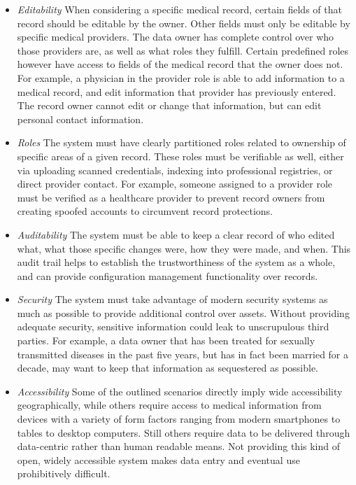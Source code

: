\documentclass[10pt, conference, compsocconf]{IEEEtran}
\begin{document}
\begin{itemize}

\item \textit{Editability} When considering a specific medical record, certain fields of that record should be editable by the owner.  Other fields must only be editable by specific medical providers.  The data owner has complete control over who those providers are, as well as what roles they fulfill.  Certain predefined roles however have access to fields of the medical record that the owner does not.  For example, a physician in the provider role is able to add information to a medical record, and edit information that provider has previously entered.  The record owner cannot edit or change that information, but can edit personal contact information.

\item \textit{Roles} The system must have clearly partitioned roles related to ownership of specific areas of a given record.  These roles must be verifiable as well, either via uploading scanned credentials, indexing into professional registries, or direct provider contact.  For example, someone assigned to a provider role must be verified as a healthcare provider to prevent record owners from creating spoofed accounts to circumvent record protections.

\item \textit{Auditability} The system must be able to keep a clear record of who edited what, what those specific changes were, how they were made, and when.  This audit trail helps to establish the trustworthiness of the system as a whole, and can provide configuration management functionality over records.

\item \textit{Security} The system must take advantage of modern security systems as much as possible to provide additional control over assets.  Without providing adequate security, sensitive information could leak to unscrupulous third parties.  For example, a data owner that has been treated for sexually transmitted diseases in the past five years, but has in fact been married for a decade, may want to keep that information as sequestered as possible.

\item \textit{Accessibility} Some of the outlined scenarios directly imply wide accessibility geographically, while others require access to medical information from devices with a variety of form factors ranging from modern smartphones to tables to desktop computers.  Still others require data to be delivered through data-centric rather than human readable means.  Not providing this kind of open, widely accessible system makes data entry and eventual use prohibitively difficult.


\end{itemize}
\end{document}
